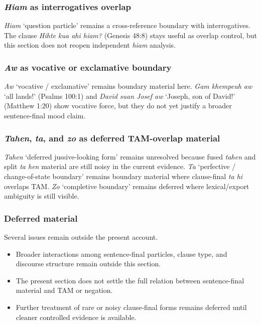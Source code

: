 \documentclass[
  11pt,
  a4paper,
]{article}
\providecommand{\tightlist}{%
  \setlength{\itemsep}{0pt}\setlength{\parskip}{0pt}}
\newcommand{\tdim}[1]{\textit{#1}}
\newcommand{\glossquote}[1]{`#1'}
\begin{document}
\subsubsection{\texorpdfstring{\tdim{Hiam} as interrogatives
overlap}{ as interrogatives overlap}}\label{as-interrogatives-overlap}

\tdim{Hiam} \glossquote{question particle} remains a cross-reference
boundary with interrogatives. The clause \tdim{Hihte kua ahi hiam?}
(Genesis 48:8) stays useful as overlap control, but this section does
not reopen independent \tdim{hiam} analysis.

\subsubsection{\texorpdfstring{\tdim{Aw} as vocative or exclamative
boundary}{ as vocative or exclamative boundary}}\label{as-vocative-or-exclamative-boundary}

\tdim{Aw} \glossquote{vocative / exclamative} remains boundary material
here. \tdim{Gam khempeuh aw} \glossquote{all lands!} (Psalms 100:1) and
\tdim{David suan Josef aw} \glossquote{Joseph, son of David!} (Matthew
1:20) show vocative force, but they do not yet justify a broader
sentence-final mood claim.

\subsubsection{\texorpdfstring{\tdim{Tahen}, \tdim{ta}, and \tdim{zo} as
deferred TAM-overlap
material}{, , and  as deferred TAM-overlap material}}\label{and-as-deferred-tam-overlap-material}

\tdim{Tahen} \glossquote{deferred jussive-looking form} remains
unresolved because fused \tdim{tahen} and split \tdim{ta hen} material
are still noisy in the current evidence. \tdim{Ta}
\glossquote{perfective / change-of-state boundary} remains boundary
material where clause-final \tdim{ta hi} overlaps TAM. \tdim{Zo}
\glossquote{completive boundary} remains deferred where lexical/export
ambiguity is still visible.

\subsubsection{Deferred material}\label{deferred-material-11}

Several issues remain outside the present account.

\begin{itemize}
\tightlist
\item
  Broader interactions among sentence-final particles, clause type, and
  discourse structure remain outside this section.
\item
  The present section does not settle the full relation between
  sentence-final material and TAM or negation.
\item
  Further treatment of rare or noisy clause-final forms remains deferred
  until cleaner controlled evidence is available.
\end{itemize}
\end{document}
